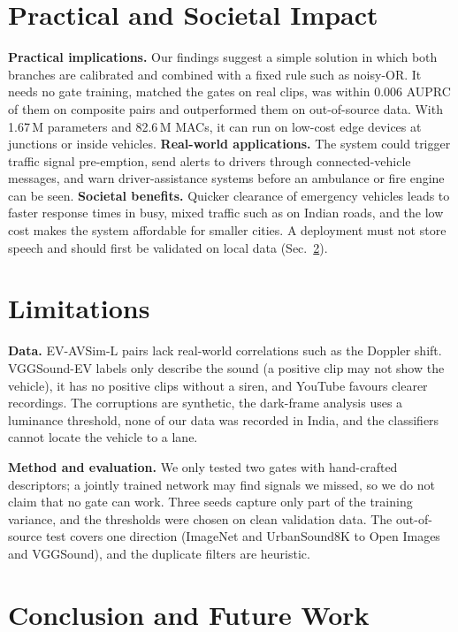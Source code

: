 \documentclass[runningheads,a4paper]{llncs}
\begin{document}
\section{Practical and Societal Impact}

\textbf{Practical implications.} Our findings suggest a simple solution in
which both branches are calibrated and combined with a fixed rule such as
noisy-OR. It needs no gate training, matched the gates on real clips, was within 0.006
AUPRC of them on composite pairs and outperformed them on out-of-source data.
With 1.67\,M parameters and 82.6\,M MACs, it can run on low-cost edge devices
at junctions or inside vehicles. \textbf{Real-world applications.} The system could trigger traffic signal
pre-emption, send alerts to drivers through connected-vehicle messages, and
warn driver-assistance systems before an ambulance or fire engine can be
seen. \textbf{Societal benefits.} Quicker clearance of emergency vehicles leads to
faster response times in busy, mixed traffic such as on Indian roads, and the
low cost makes the system affordable for smaller cities. A deployment must not
store speech and should first be validated on local data
(Sec.~\ref{sec:limitations}).

\section{Limitations}
\label{sec:limitations}

\textbf{Data.} EV-AVSim-L pairs lack real-world correlations such as the
Doppler shift. VGGSound-EV labels only describe the sound (a positive clip may
not show the vehicle), it has no positive clips without a siren, and YouTube
favours clearer recordings. The corruptions are synthetic,
the dark-frame analysis uses a luminance threshold, none of our data was
recorded in India, and the classifiers cannot locate the vehicle to a lane.

\textbf{Method and evaluation.} We only tested two gates with hand-crafted
descriptors; a jointly trained network may find signals we missed, so we do
not claim that no gate can work. Three seeds capture only part of the training
variance, and the thresholds were chosen on clean validation data. The out-of-source test covers one direction (ImageNet
and UrbanSound8K to Open Images and VGGSound), and the duplicate filters are
heuristic.

\section{Conclusion and Future Work}
\end{document}
